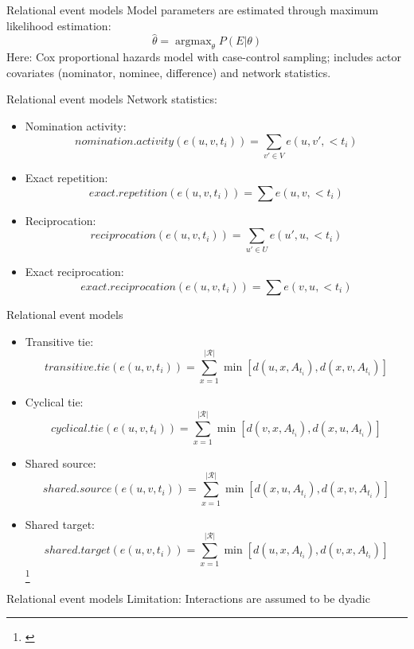 \documentclass{beamer}
\DeclareMathOperator*{\argmax}{argmax}
\begin{document}
	\begin{frame}{Relational event models}
		Model parameters are estimated through maximum likelihood estimation:
		\begin{equation*}
			\hat{\theta} = \argmax_{\theta} P(E|\theta)
		\end{equation*}
		Here: Cox proportional hazards model with case-control sampling; includes actor covariates (nominator, nominee, difference) and network statistics.
	\end{frame}

	\begin{frame}{Relational event models}
		Network statistics:
		\begin{itemize}
			\item Nomination activity: \[nomination.activity(e(u,v,t_i)) = \sum_{v' \in V} e(u,v',<t_i)\]
			\item Exact repetition: \[exact.repetition(e(u,v,t_i)) = \sum e(u,v,<t_i)\]
			\item Reciprocation: \[reciprocation(e(u,v,t_i)) = \sum_{u' \in U} e(u',u,<t_i)\]
			\item Exact reciprocation: \[exact.reciprocation(e(u,v,t_i)) = \sum e(v,u,<t_i)\]
		\end{itemize}
	\end{frame}

	\begin{frame}{Relational event models}
		\begin{itemize}
			\item Transitive tie: \[transitive.tie(e(u,v,t_i)) = \sum_{x=1}^{\lvert \mathcal{R} \rvert} \min [d(u,x,A_{t_i}), d(x,v,A_{t_i})]\]
			\item Cyclical tie: \[cyclical.tie(e(u,v,t_i)) = \sum_{x=1}^{\lvert \mathcal{R} \rvert} \min [d(v,x,A_{t_i}), d(x,u,A_{t_i})]\]
			\item Shared source: \[shared.source(e(u,v,t_i)) = \sum_{x=1}^{\lvert \mathcal{R} \rvert} \min [d(x,u,A_{t_i}), d(x,v,A_{t_i})]\]
			\item Shared target: \[shared.target(e(u,v,t_i)) = \sum_{x=1}^{\lvert \mathcal{R} \rvert} \min [d(u,x,A_{t_i}), d(v,x,A_{t_i})]\]\footnote{\cite{butts20084,pilny_rem,brandes2009networks,perry2013point}}
		\end{itemize}
	\end{frame}

	\begin{frame}{Relational event models}
		Limitation: Interactions are assumed to be dyadic
	\end{frame}
\end{document}
